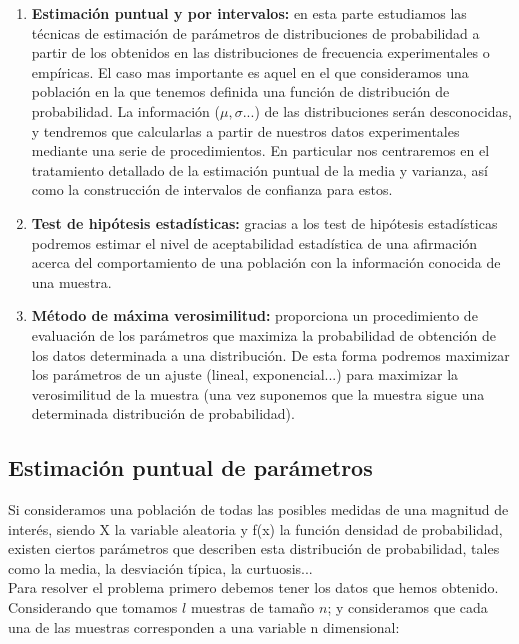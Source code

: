 \documentclass[12pt,a4paper]{book}
\begin{document}
\begin{enumerate}
\item \textbf{Estimación puntual y por intervalos:} en esta parte estudiamos las técnicas de estimación de parámetros de distribuciones de probabilidad a partir de los obtenidos en las distribuciones de frecuencia experimentales o empíricas. El caso mas importante es aquel en el que consideramos una población en la que tenemos definida una función de distribución de probabilidad. La información ($\mu, \sigma...$) de las distribuciones serán desconocidas, y tendremos que calcularlas a partir de nuestros datos experimentales mediante una serie de procedimientos. En particular nos centraremos en el tratamiento detallado de la estimación puntual de la media y varianza, así como la construcción de intervalos de confianza para estos.

\item \textbf{Test de hipótesis estadísticas:} gracias a los test de hipótesis estadísticas podremos estimar el nivel de aceptabilidad estadística de una afirmación acerca del comportamiento de una población con la información conocida de una muestra.

\item \textbf{Método de máxima verosimilitud:} proporciona un procedimiento de evaluación de los parámetros que maximiza la probabilidad de obtención de los datos determinada a una distribución. De esta forma podremos maximizar los parámetros de un ajuste (lineal, exponencial...) para maximizar la verosimilitud de la muestra (una vez suponemos que la muestra sigue una determinada distribución de probabilidad).
\end{enumerate}


\subsection{Estimación puntual de parámetros}
Si consideramos una población de todas las posibles medidas de una magnitud de interés, siendo X la variable aleatoria y f(x) la función densidad de probabilidad, existen ciertos parámetros que describen esta distribución de probabilidad, tales como la media, la desviación típica, la curtuosis...  \\

Para resolver el problema primero debemos tener los datos que hemos obtenido. Considerando que tomamos $l$ muestras de tamaño $n$; y consideramos que cada una de las muestras corresponden a una variable n dimensional:
\end{document}
